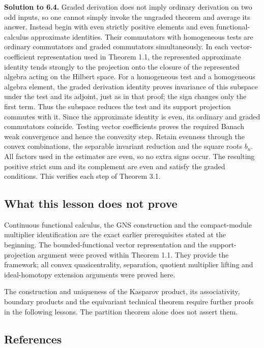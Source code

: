 \documentclass[
  11pt,
]{article}
\begin{document}
\textbf{Solution to 6.4.} Graded derivation does not imply ordinary
derivation on two odd inputs, so one cannot simply invoke the ungraded
theorem and average its answer. Instead begin with even strictly
positive elements and even functional-calculus approximate identities.
Their commutators with homogeneous tests are ordinary commutators and
graded commutators simultaneously. In each vector-coefficient
representation used in Theorem 1.1, the represented approximate identity
tends strongly to the projection onto the closure of the represented
algebra acting on the Hilbert space. For a homogeneous test and a
homogeneous algebra element, the graded derivation identity proves
invariance of this subspace under the test and its adjoint, just as in
that proof; the sign changes only the first term. Thus the subspace
reduces the test and its support projection commutes with it. Since the
approximate identity is even, its ordinary and graded commutators
coincide. Testing vector coefficients proves the required Banach weak
convergence and hence the convexity step. Retain evenness through the
convex combinations, the separable invariant reduction and the square
roots \(b_n\). All factors used in the estimates are even, so no extra
signs occur. The resulting positive strict sum and its complement are
even and satisfy the graded conditions. This verifies each step of
Theorem 3.1.

\subsection{What this lesson does not
prove}\label{what-this-lesson-does-not-prove}

Continuous functional calculus, the GNS construction and the
compact-module multiplier identification are the exact earlier
prerequisites stated at the beginning. The bounded-functional vector
representation and the support-projection argument were proved within
Theorem 1.1. They provide the framework; all convex quasicentrality,
separation, quotient multiplier lifting and ideal-homotopy extension
arguments were proved here.

The construction and uniqueness of the Kasparov product, its
associativity, boundary products and the equivariant technical theorem
require further proofs in the following lessons. The partition theorem
alone does not assert them.

\subsection{References}\label{references}
\end{document}
